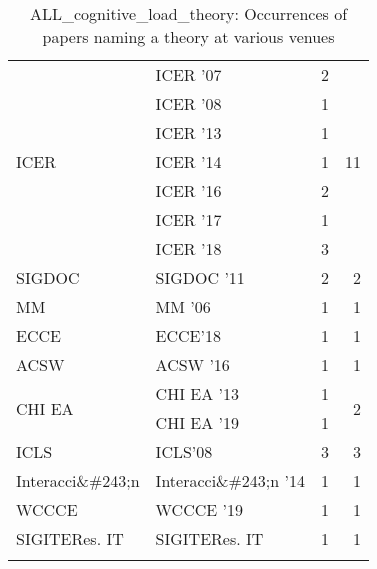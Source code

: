 \begin{table*}[t]
\begin{tabular}{llrr}
\multirow{7}{*}{ICER } & ICER '07 & 2 & \multirow{7}{*}{11}\\
& ICER '08 & 1 &\\
& ICER '13 & 1 &\\
& ICER '14 & 1 &\\
& ICER '16 & 2 &\\
& ICER '17 & 1 &\\
& ICER '18 & 3 &\\
\multirow{1}{*}{SIGDOC } & SIGDOC '11 & 2 & \multirow{1}{*}{2}\\
\multirow{1}{*}{MM } & MM '06 & 1 & \multirow{1}{*}{1}\\
\multirow{1}{*}{ECCE} & ECCE'18 & 1 & \multirow{1}{*}{1}\\
\multirow{1}{*}{ACSW } & ACSW '16 & 1 & \multirow{1}{*}{1}\\
\multirow{2}{*}{CHI EA } & CHI EA '13 & 1 & \multirow{2}{*}{2}\\
& CHI EA '19 & 1 &\\
\multirow{1}{*}{ICLS} & ICLS'08 & 3 & \multirow{1}{*}{3}\\
\multirow{1}{*}{Interacci\&\#243;n } & Interacci\&\#243;n '14 & 1 & \multirow{1}{*}{1}\\
\multirow{1}{*}{WCCCE } & WCCCE '19 & 1 & \multirow{1}{*}{1}\\
\multirow{1}{*}{SIGITERes. IT} & SIGITERes. IT & 1 & \multirow{1}{*}{1}\\
\caption{ALL_cognitive_load_theory: Occurrences of papers naming a theory at various venues}
\end{tabular}
\end{table*}